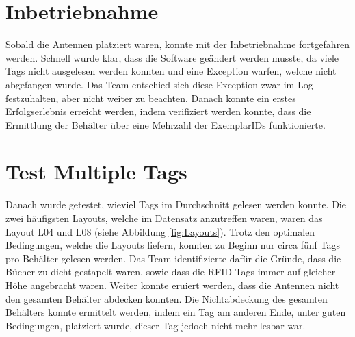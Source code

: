 \documentclass[parskip=full, a4paper]{scrartcl}
\begin{document}
\section{Inbetriebnahme}
Sobald die Antennen platziert waren, konnte mit der Inbetriebnahme fortgefahren werden. Schnell wurde klar, dass die Software geändert werden musste, da viele Tags nicht ausgelesen werden konnten und eine Exception warfen, welche nicht abgefangen wurde. Das Team entschied sich diese Exception zwar im Log festzuhalten, aber nicht weiter zu beachten. Danach konnte ein erstes Erfolgserlebnis erreicht werden, indem verifiziert werden konnte, dass die Ermittlung der Behälter über eine Mehrzahl der ExemplarIDs funktionierte.

\section{Test Multiple Tags}
Danach wurde getestet, wieviel Tags im Durchschnitt gelesen werden konnte. Die zwei häufigsten Layouts, welche im Datensatz anzutreffen waren, waren das Layout L04 und L08 (siehe Abbildung \ref{fig:Layouts}). Trotz den optimalen Bedingungen, welche die Layouts liefern, konnten zu Beginn nur circa fünf Tags pro Behälter gelesen werden. Das Team identifizierte dafür die Gründe, dass die Bücher zu dicht gestapelt waren, sowie dass die RFID Tags immer auf gleicher Höhe angebracht waren. Weiter konnte eruiert werden, dass die Antennen nicht den gesamten Behälter abdecken konnten. Die Nichtabdeckung des gesamten Behälters konnte ermittelt werden, indem ein Tag am anderen Ende, unter guten Bedingungen, platziert wurde, dieser Tag jedoch nicht mehr lesbar war.
\end{document}
